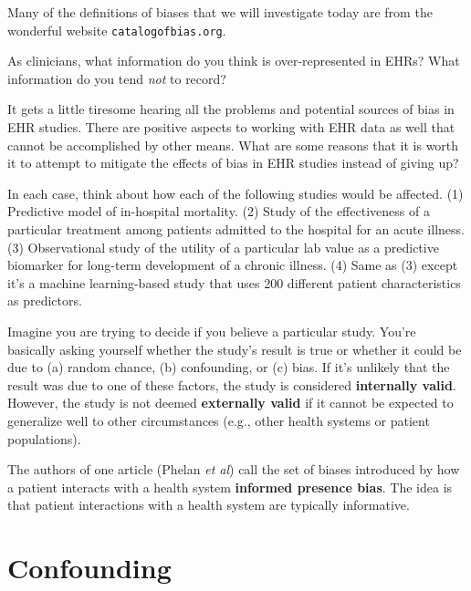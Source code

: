 Many of the definitions of biases that we will investigate today are from the wonderful website \texttt{catalogofbias.org}. 

\begin{question}{}
As clinicians, what information do you think is over-represented in EHRs? What information do you tend \emph{not} to record?
\end{question}

\begin{question}{}
It gets a little tiresome hearing all the problems and potential sources of bias in EHR studies. There are positive aspects to working with EHR data as well that cannot be accomplished by other means. What are some reasons that it is worth it to attempt to mitigate the effects of bias in EHR studies instead of giving up?
\end{question}

\begin{question}{}
In each case, think about how each of the following studies would be affected. (1) Predictive model of in-hospital mortality. (2) Study of the effectiveness of a particular treatment among patients admitted to the hospital for an acute illness. (3) Observational study of the utility of a particular lab value as a predictive biomarker for long-term development of a chronic illness. (4) Same as (3) except it's a machine learning-based study that uses 200 different patient characteristics as predictors. 
\end{question}

Imagine you are trying to decide if you believe a particular study. You're basically asking yourself whether the study's result is true or whether it could be due to (a) random chance, (b) confounding, or (c) bias. If it's unlikely that the result was due to one of these factors, the study is considered \textbf{internally valid}. However, the study is not deemed \textbf{externally valid} if it cannot be expected to generalize well to other circumstances (e.g., other health systems or patient populations).

The authors of one article (Phelan \emph{et al}) call the set of biases introduced by how a patient interacts with a health system \textbf{informed presence bias}. The idea is that patient interactions with a health system are typically informative. 


\section{Confounding}

